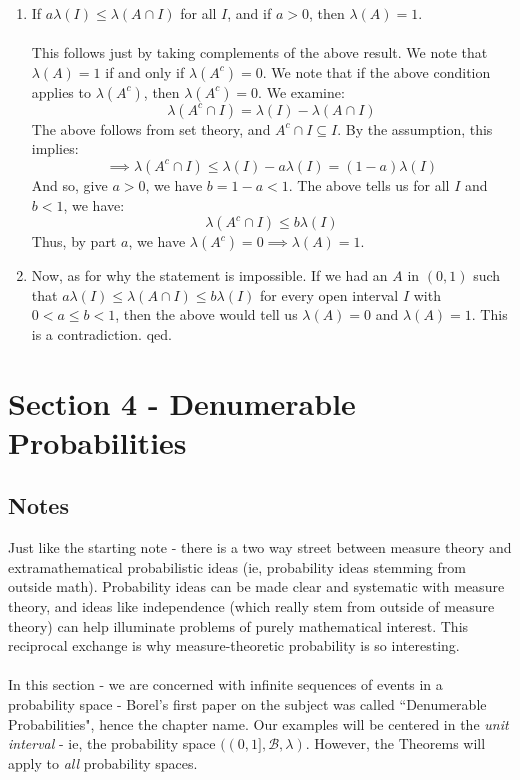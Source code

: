 \documentclass[12pt,a4paper]{article}
\newcommand{\1}[1]{\mathbbm{1}\left\{ #1 \right\}}
\newcommand{\bcal}{\mathcal{B}}
\begin{document}
\begin{enumerate}
	\item If $a \lambda(I) \leq \lambda(A \cap I)$ for all $I$, and if $a > 0$, then $\lambda(A) = 1$.
	\\\\
	This follows just by taking complements of the above result. We note that $\lambda(A) = 1$ if and only if $\lambda(A^c) = 0$. We note that if the above condition applies to $\lambda(A^c)$, then $\lambda(A^c) = 0$. We examine:
	$$
		\lambda(A^c \cap I) = \lambda(I) - \lambda(A \cap I)
	$$
	The above follows from set theory, and $A^c \cap I \subseteq I$. By the assumption, this implies:
	$$
		\implies \lambda(A^c \cap I) \leq \lambda(I) - a \lambda(I) = (1-a) \lambda(I)
	$$
	And so, give $a > 0$, we have $b = 1 - a < 1$. The above tells us for all $I$ and $b < 1$, we have:
	$$
		\lambda(A^c \cap I) \leq b\lambda(I)
	$$
	Thus, by part $a$, we have $\lambda(A^c) = 0 \implies \lambda(A) = 1$.
	
	\item Now, as for why the statement is impossible. If we had an $A$ in $(0,1)$ such that $a \lambda(I) \leq \lambda(A \cap I) \leq b\lambda(I)$ for every open interval $I$ with $0 < a \leq b < 1$, then the above would tell us $\lambda(A) = 0$ and $\lambda(A) = 1$. This is a contradiction. qed.
\end{enumerate}


\section{Section 4 - Denumerable Probabilities}
\subsection{Notes} Just like the starting note - there is a two way street between measure theory and extramathematical probabilistic ideas (ie, probability ideas stemming from outside math). Probability ideas can be made clear and systematic with measure theory, and ideas like independence (which really stem from outside of measure theory) can help illuminate problems of purely mathematical interest. This reciprocal exchange is why measure-theoretic probability is so interesting.
\\\\
In this section - we are concerned with infinite sequences of events in a probability space - Borel's first paper on the subject was called ``Denumerable Probabilities", hence the chapter name. Our examples will be centered in the \textit{unit interval} - ie, the probability space $((0,1],\bcal,\lambda)$. However, the Theorems will apply to \textit{all} probability spaces.
\end{document}
